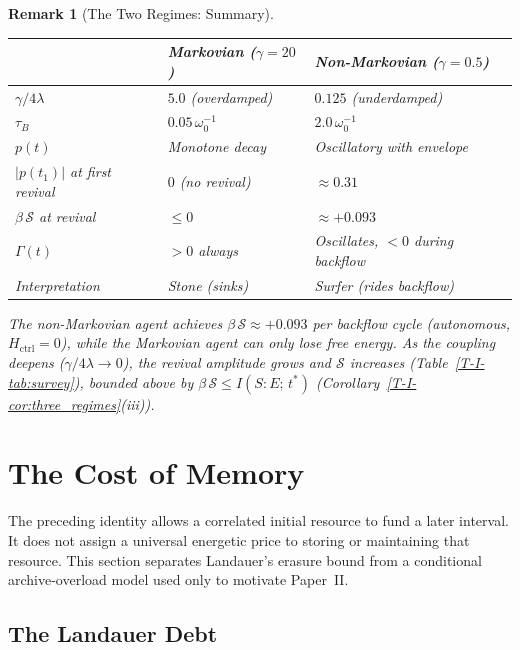 \documentclass[12pt,a4paper,openany]{book}
\newtheorem{remark}[theorem]{Remark}
\begin{document}
\begin{remark}[The Two Regimes: Summary]
\label{T-I-rem:two_regimes}
\begin{center}
\begin{tabular}{@{}lll@{}}
\toprule
& \textbf{Markovian ($\gamma = 20$)}
& \textbf{Non-Markovian ($\gamma = 0.5$)} \\
\midrule
$\gamma / 4\lambda$ & $5.0$ (overdamped)
  & $0.125$ (underdamped) \\
$\tau_B$ & $0.05\,\omega_0^{-1}$
  & $2.0\,\omega_0^{-1}$ \\
$p(t)$ & Monotone decay
  & Oscillatory with envelope \\
$|p(t_1)|$ at first revival & $0$ (no revival)
  & $\approx 0.31$ \\
$\beta\,\mathcal{S}$ at revival & $\leq 0$
  & $\approx +0.093$ \\
$\Gamma(t)$ & $> 0$ always
  & Oscillates, $< 0$ during backflow \\
Interpretation & Stone (sinks)
  & Surfer (rides backflow) \\
\bottomrule
\end{tabular}
\end{center}
The non-Markovian agent achieves
$\beta\,\mathcal{S} \approx +0.093$
per backflow cycle (autonomous, $H_{\mathrm{ctrl}} = 0$),
while the Markovian agent can only lose free energy.
As the coupling deepens ($\gamma/4\lambda \to 0$), the
revival amplitude grows and
$\mathcal{S}$ increases
(Table~\ref{T-I-tab:survey}), bounded above by
$\beta\,\mathcal{S} \leq I(S{:}E;\, t^*)$
(Corollary~\ref{T-I-cor:three_regimes}(iii)).
\end{remark}

\section{The Cost of Memory}
\label{T-I-sec:cost}

The preceding identity allows a correlated initial resource to fund a
later interval.  It does not assign a universal energetic price to
storing or maintaining that resource.  This section separates
Landauer's erasure bound from a conditional archive-overload model used
only to motivate Paper~II.

\subsection{The Landauer Debt}
\end{document}
